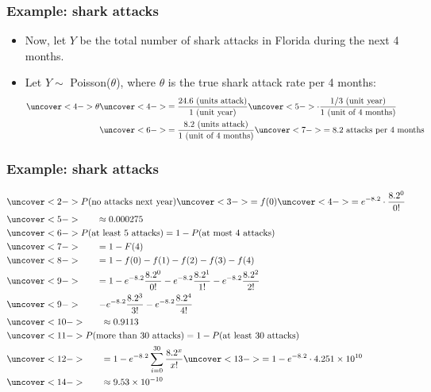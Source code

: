 \documentclass[handout]{beamer}\usepackage[]{graphicx}\usepackage[]{color}
\numberwithin{equation}{section}
\begin{document}
\begin{frame}
\frametitle{Example: shark attacks}
\begin{itemize}
\pause \item Now, let $Y$ be the total number of shark attacks in Florida during the next 4 months.
\pause \item Let $Y \sim $ Poisson($\theta$), where $\theta$ is the true shark attack rate per 4 months:
\begin{align*}
\uncover<4->{\theta} &\uncover<4->{= \frac{24.6 \text{ (units attack)}}{1 \text{ (unit year)}}} \uncover<5->{ \cdot \frac{1/3 \text{ (unit year)}}{1 \text{ (unit of 4 months)}}} \\
& \uncover<6->{= \frac{8.2 \text{ (units attack)}}{1 \text{ (unit of 4 months)}}} \uncover<7->{ = 8.2 \text{ attacks per 4 months}}
\end{align*}
\end{itemize}
\end{frame}

\begin{frame}
\frametitle{Example: shark attacks} \small
\begin{align*}
&\uncover<2->{P(\text{no attacks next year}) \uncover<3->{=f(0)} \uncover<4->{= e^{-8.2} \cdot \frac{8.2^0}{0!}}} \\
&\uncover<5->{ \qquad \approx 0.000275} \\
&\uncover<6->{P(\text{at least 5 attacks}) = 1 - P(\text{at most 4 attacks})} \\
&\uncover<7->{ \qquad =1 - F(4)} \\
&\uncover<8->{ \qquad =1 - f(0) - f(1) - f(2) - f(3) - f(4)} \\
&\uncover<9->{ \qquad =1 - e^{-8.2} \frac{8.2^0}{0!} - e^{-8.2} \frac{8.2^1}{1!} - e^{-8.2} \frac{8.2^2}{2!}} \\
&\uncover<9->{ \qquad - e^{-8.2} \frac{8.2^3}{3!} - e^{-8.2} \frac{8.2^4}{4!}} \\
&\uncover<10->{\qquad \approx 0.9113} \\
&\uncover<11->{P(\text{more than 30 attacks}) = 1 - P(\text{at least 30 attacks})} \\
&\uncover<12->{ \qquad= 1 - e^{-8.2} \sum_{i = 0}^{30} \frac{8.2^x}{x!}} \uncover<13->{= 1 - e^{-8.2} \cdot 4.251 \times 10^{10}} \\
&\uncover<14->{ \qquad \approx 9.53 \times 10^{-10}}
\end{align*}
\end{frame}
\end{document}
